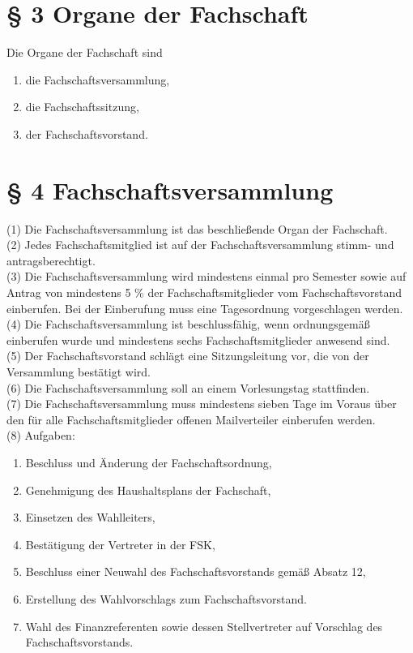 \documentclass[a4paper, parskip=half, numbers=noenddot]{scrartcl}
\begin{document}
%
%

\section*{§ 3 Organe der Fachschaft}

Die Organe der Fachschaft sind
\begin{enumerate}
    \item die Fachschaftsversammlung,
    \item die Fachschaftssitzung,
    \item der Fachschaftsvorstand.
\end{enumerate}



%
%

\section*{§ 4 Fachschaftsversammlung}

(1) Die Fachschaftsversammlung ist das beschließende Organ der Fachschaft.\\

(2) Jedes Fachschaftsmitglied ist auf der Fachschaftsversammlung stimm- und antragsberechtigt.\\

(3) Die Fachschaftsversammlung wird mindestens einmal pro Semester sowie auf Antrag von mindestens 5 \% der Fachschaftsmitglieder vom Fachschaftsvorstand einberufen. Bei der Einberufung muss eine Tagesordnung vorgeschlagen werden.\\

(4) Die Fachschaftsversammlung ist beschlussfähig, wenn ordnungsgemäß einberufen wurde und mindestens sechs Fachschaftsmitglieder anwesend sind.\\

(5) Der Fachschaftsvorstand schlägt eine Sitzungsleitung vor, die von der Versammlung bestätigt wird.\\

(6) Die Fachschaftsversammlung soll an einem Vorlesungstag stattfinden.\\

(7) Die Fachschaftsversammlung muss mindestens sieben Tage im Voraus über den für alle Fachschaftsmitglieder offenen Mailverteiler einberufen werden.\\

(8) Aufgaben:
\begin{enumerate}
\item Beschluss und Änderung der Fachschaftsordnung,
\item Genehmigung des Haushaltsplans der Fachschaft,
\item Einsetzen des Wahlleiters,
\item Bestätigung der Vertreter in der FSK,
\item Beschluss einer Neuwahl des Fachschaftsvorstands gemäß Absatz 12,
\item Erstellung des Wahlvorschlags zum Fachschaftsvorstand.
\item Wahl des Finanzreferenten sowie dessen Stellvertreter auf Vorschlag des Fachschaftsvorstands.
\end{enumerate}
\end{document}

